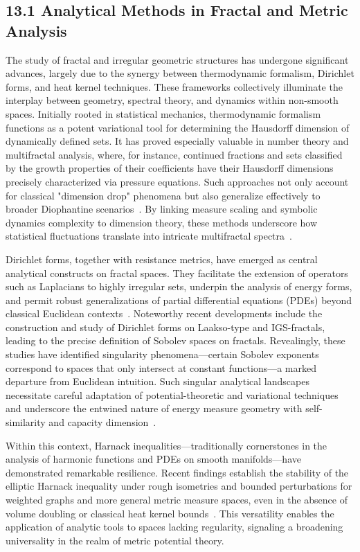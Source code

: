 \documentclass[11pt]{article}
\begin{document}
\subsection{13.1 Analytical Methods in Fractal and Metric Analysis}

The study of fractal and irregular geometric structures has undergone significant advances, largely due to the synergy between thermodynamic formalism, Dirichlet forms, and heat kernel techniques. These frameworks collectively illuminate the interplay between geometry, spectral theory, and dynamics within non-smooth spaces. Initially rooted in statistical mechanics, thermodynamic formalism functions as a potent variational tool for determining the Hausdorff dimension of dynamically defined sets. It has proved especially valuable in number theory and multifractal analysis, where, for instance, continued fractions and sets classified by the growth properties of their coefficients have their Hausdorff dimensions precisely characterized via pressure equations. Such approaches not only account for classical "dimension drop" phenomena but also generalize effectively to broader Diophantine scenarios~\cite{ref13}. By linking measure scaling and symbolic dynamics complexity to dimension theory, these methods underscore how statistical fluctuations translate into intricate multifractal spectra~\cite{ref9}.

Dirichlet forms, together with resistance metrics, have emerged as central analytical constructs on fractal spaces. They facilitate the extension of operators such as Laplacians to highly irregular sets, underpin the analysis of energy forms, and permit robust generalizations of partial differential equations (PDEs) beyond classical Euclidean contexts~\cite{ref43,ref51,ref40}. Noteworthy recent developments include the construction and study of Dirichlet forms on Laakso-type and IGS-fractals, leading to the precise definition of Sobolev spaces on fractals. Revealingly, these studies have identified singularity phenomena—certain Sobolev exponents correspond to spaces that only intersect at constant functions—a marked departure from Euclidean intuition. Such singular analytical landscapes necessitate careful adaptation of potential-theoretic and variational techniques and underscore the entwined nature of energy measure geometry with self-similarity and capacity dimension~\cite{ref43,ref40}.

Within this context, Harnack inequalities—traditionally cornerstones in the analysis of harmonic functions and PDEs on smooth manifolds—have demonstrated remarkable resilience. Recent findings establish the stability of the elliptic Harnack inequality under rough isometries and bounded perturbations for weighted graphs and more general metric measure spaces, even in the absence of volume doubling or classical heat kernel bounds~\cite{ref38}. This versatility enables the application of analytic tools to spaces lacking regularity, signaling a broadening universality in the realm of metric potential theory.
\end{document}
